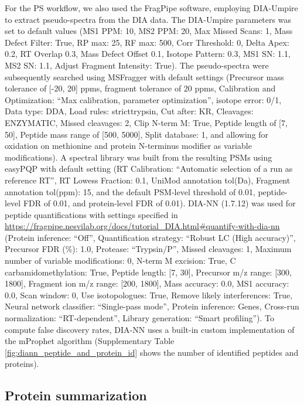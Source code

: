 \documentclass[10pt,letterpaper]{article}
\begin{document}
For the PS workflow, we also used the FragPipe software, employing DIA-Umpire to extract pseudo-spectra from the DIA data. The DIA-Umpire parameters was set to default values (MS1 PPM: 10, MS2 PPM: 20, Max Missed Scans: 1, Mass Defect Filter: True, RP max: 25, RF max: 500, Corr Threshold: 0, Delta Apex: 0.2, RT Overlap 0.3, Mass Defect Offset 0.1, Isotope Pattern: 0.3, MS1 SN: 1.1, MS2 SN: 1.1, Adjust Fragment Intensity: True). The pseudo-spectra were subsequently searched using MSFragger with default settings (Precursor mass tolerance of [-20, 20] ppms, fragment tolerance of 20 ppms, Calibration and Optimization: ``Max calibration, parameter optimization'', isotope error: 0/1, Data type: DDA, Load rules: stricttrypsin, Cut after: KR, Cleavages: ENZYMATIC, Missed cleavages: 2, Clip N-term M: True, Peptide length of [7, 50], Peptide mass range of [500, 5000], Split database: 1, and allowing for oxidation on methionine and protein N-terminus modifier as variable modifications). A spectral library was built from the resulting PSMs using easyPQP with default setting (RT Calibration: ``Automatic selection of a run as reference RT'', RT Lowess Fraction: 0.1, UniMod annotation tol(Da), Fragment annotation tol(ppm): 15, and the default PSM-level threshold of 0.01, peptide-level FDR of 0.01, and protein-level FDR of 0.01). DIA-NN (1.7.12) was used for peptide quantifications with settings specified in \url{https://fragpipe.nesvilab.org/docs/tutorial_DIA.html#quantify-with-dia-nn} (Protein inference: ``Off'', Quantification strategy: ``Robust LC (High accuracy)'', Precursor FDR (\%): 1.0, Protease: ``Trypsin/P'', Missed cleavages: 1, Maximum number of variable modifications: 0, N-term M excision: True, C carbamidomethylation: True, Peptide length: [7, 30], Precursor m/z range: [300, 1800], Fragment ion m/z range: [200, 1800], Mass accuracy: 0.0, MS1 accuracy: 0.0, Scan window: 0, Use isotopologues: True, Remove likely interferences: True, Neural network classifier: ``Single-pass mode'', Protein inference: Genes, Cross-run normalization: ``RT-dependent'', Library generation: ``Smart profiling''). To compute false discovery rates, DIA-NN uses a built-in custom implementation of the mProphet algorithm\cite{reiter2011mprophet, demichev2020dia} (Supplementary Table \ref{fig:diann_peptide_and_protein_id} shows the number of identified peptides and proteins). 
 
\subsection*{Protein summarization}
\end{document}
